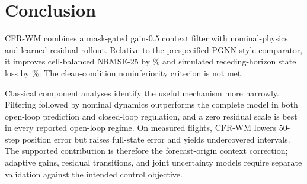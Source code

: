 \section{Conclusion}

CFR-WM combines a mask-gated gain-0.5 context filter with nominal-physics and
learned-residual rollout. Relative to the prespecified PGNN-style comparator,
it improves cell-balanced NRMSE-25 by \PrimaryImprovement\% and simulated
receding-horizon state loss by \ClosedLoopImprovement\%. The clean-condition
noninferiority criterion is not met.

Classical component analyses identify the useful mechanism more narrowly.
Filtering followed by nominal dynamics outperforms the complete model in both
open-loop prediction and closed-loop regulation, and a zero residual scale is
best in every reported open-loop regime. On measured flights, CFR-WM lowers
50-step position error but raises full-state error and yields undercovered
intervals. The supported contribution is therefore the forecast-origin
context correction; adaptive gains, residual transitions, and joint
uncertainty models require separate validation against the intended control
objective.
